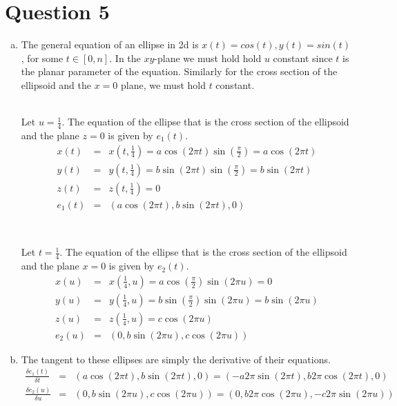 \documentclass{article} %
\begin{document}
\section{Question 5}
\begin{enumerate}[a)]

\item
The general equation of an ellipse in 2d is $x(t) = cos(t), y(t) = sin(t)$, for some $t \in [0,n]$. In the $xy$-plane we must hold hold $u$ constant since $t$ is the planar parameter of the equation. Similarly for the cross section of the ellipsoid and the $x=0$ plane, we must hold $t$ constant.
\\
\\
\begin{minipage}{0.45\textwidth}
Let $u=\frac{1}{4}$. The equation of the ellipse that is the cross section of the ellipsoid and the plane $z=0$ is given by $e_1(t)$.
\begin{eqnarray*}
x(t) &=& x\left(t, \frac{1}{4}\right) = a \cos(2\pi t) \sin\left(\frac{\pi}{2}\right) = a \cos (2 \pi t)\\
y(t) &=& y\left(t,\frac{1}{4}\right) = b \sin (2 \pi t) \sin\left(\frac{\pi}{2}\right) = b \sin (2 \pi t)\\
z(t) &=& z\left(t,\frac{1}{4}\right) = 0\\
e_1(t) &=& \left(a \cos (2 \pi t), b \sin (2 \pi t), 0\right)
\end{eqnarray*}
\end{minipage}\
\quad\quad\quad\quad\quad
\begin{minipage}{0.45\textwidth}
Let $t=\frac{1}{4}$. The equation of the ellipse that is the cross section of the ellipsoid and the plane $x=0$ is given by $e_2(t)$.
\begin{eqnarray*}
x(u) &=& x\left(\frac{1}{4},u\right) = a \cos\left(\frac{\pi}{2}\right) \sin(2 \pi u) = 0\\
y(u) &=& y\left(\frac{1}{4},u\right) = b \sin \left(\frac{\pi}{2}\right) \sin(2 \pi u) = b \sin (2 \pi u)\\
z(u) &=& z\left(\frac{1}{4},u\right) = c \cos(2 \pi u)\\
e_2(u) &=& \left(0, b \sin (2 \pi u), c \cos(2 \pi u)\right)
\end{eqnarray*}
\end{minipage}

\item
The tangent to these ellipses are simply the derivative of their equations.
\begin{eqnarray*}
\frac{\delta e_1(t)}{\delta t} &=& \left(a \cos (2 \pi t), b \sin (2 \pi t), 0\right) = \left(-a 2 \pi \sin (2 \pi t), b 2 \pi \cos (2 \pi t), 0\right)\\
\frac{\delta e_2(u)}{\delta u} &=& \left(0, b \sin (2 \pi u), c \cos(2 \pi u)\right) = \left(0, b 2 \pi \cos (2 \pi u), - c 2 \pi \sin (2 \pi u)\right)
\end{eqnarray*}


\end{enumerate}
\end{document}
